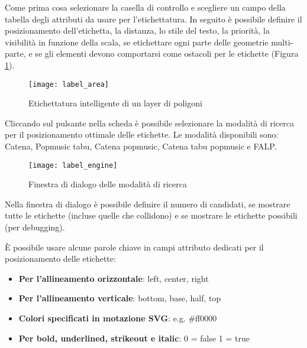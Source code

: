 
Come prima cosa selezionare la casella di controllo  e 
scegliere un campo della tabella degli attributi da usare per l'etichettatura. In seguito 
è possibile definire il posizionamento dell'etichetta, la distanza, lo stile del testo, la
priorità, la visibilità in funzione della scala, se etichettare ogni parte delle geometrie multi-parte,
e se gli elementi devono comportarsi come ostacoli per le etichette (Figura \ref{fig:arealabel}).

\begin{figure}[ht]
\centering
   \texttt{[image: label\_area]}
   \caption{Etichettatura intelligente di un layer di poligoni \nixcaption}\label{fig:arealabel}
\end{figure}


Cliccando sul pulsante  nella scheda  è possibile selezionare la modalità 
di ricerca per il posizionamento ottimale delle etichette. Le modalità disponibili sono: 
Catena, Popmusic tabu, Catena popmusic, Catena tabu popmusic e FALP.

\begin{figure}[ht]
\centering
   \texttt{[image: label\_engine]}
   \caption{Finestra di dialogo delle modalità di ricerca \nixcaption}\label{fig:labelengine}
\end{figure}

Nella finestra di dialogo è possibile definire il numero di candidati, se mostrare tutte le 
etichette (incluse quelle che collidono) e se mostrare le etichette possibili (per debugging).


È possibile usare alcune parole chiave in campi attributo dedicati per il posizionamento delle etichette:

\begin{itemize}[label=--]
\item \textbf{Per l'allineamento orizzontale}: left, center, right
\item \textbf{Per l'allineamento verticale}: bottom, base, half, top
\item \textbf{Colori specificati in motazione SVG}: e.g. \#ff0000
\item \textbf{Per bold, underlined, strikeout e italic}: 0 = false 1 = true
\end{itemize}

